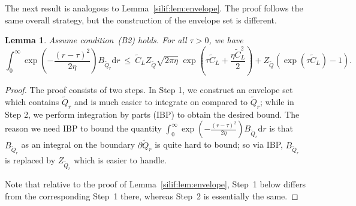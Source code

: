 \documentclass[11pt,letterpaper]{article}
\newcommand{\Q}{\widetilde{Q}}
\newcommand{\D}{\mathrm{d}}
\newcommand{\brac}[1]{\left( #1\right)}
\newtheorem{lemma}[thm]{Lemma}
\begin{document}


The next result is analogous to Lemma~\ref{silif:lem:envelope}. The proof follows the same overall strategy, but the construction of the envelope set is different.
\begin{lemma}
\label{dolif:lem:envelope}
Assume condition~(B2) holds. For all $\tau>0$, we have 
\[\int_{0}^{\infty} \exp \left(-\frac{(r-\tau)^2}{2\eta}\right)
B_{\Q_r}  \D r
\ \le\
\widetilde{C}_L  Z_{\Q}  \sqrt{2\pi\eta}\;
\exp \left(\tau \widetilde{C}_L + \frac{\eta \widetilde{C}_L^2}{2}\right)+Z_{\Q}\brac{\exp(\tau \widetilde{C}_L)-1}. \]
\end{lemma}

\begin{proof}  
The proof consists of two steps. In Step 1, we construct an envelope set which contains $\Q_r$ and is much easier to integrate on compared to $\Q_r$; while in Step 2, we perform integration by parts (IBP) to obtain the desired bound. The reason we need IBP to bound the quantity $\int_{0}^{\infty} \exp \left(-\frac{(r-\tau)^2}{2\eta}\right)
B_{\Q_r}  \D r$ is that $B_{\Q_r}$ as an integral on the boundary $\partial \Q_r$ is quite hard to bound; so via IBP, $B_{\Q_r}$ is replaced by $Z_{\Q_r}$ which is easier to handle.

Note that relative to the proof of Lemma~\ref{silif:lem:envelope}, Step~1 below differs from the corresponding Step~1 there, whereas Step~2 is essentially the same.


\end{proof}
\end{document}
